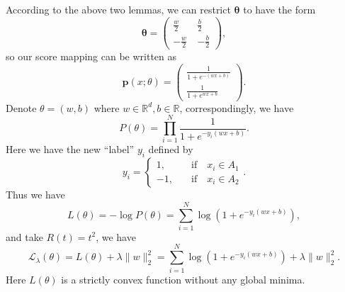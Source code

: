 According to the above two lemmas, we can restrict $\bm\theta$ to have the form
\begin{equation}
	\bm\theta = \begin{pmatrix}
	\frac{w}{2}\ &\frac{b}{2}\\
	-\frac{w}{2}\ &-\frac{b}{2}
	\end{pmatrix},
\end{equation}
so our score mapping can be written as
\begin{equation}\label{key}
\bm p(x;\theta) = \begin{pmatrix} 
	\frac{1}{1+ e^{-(wx+b)}}\\
	\frac{1}{1+e^{wx+b}}
\end{pmatrix}.
\end{equation}
Denote $\theta = (w,b)$ where $w\in \mathbb{R}^d, b\in \mathbb{R}$, correspondingly, we have
\begin{equation}
P(\theta) = \prod_{i = 1}^N \frac{1}{1+ e^{-y_i(wx+b)}}.
\end{equation}
Here we have the new ``label'' $y_i$ defined by
\begin{equation}\label{key}
y_i = \begin{cases}
1, \quad &\text{if}  \quad x_i \in A_1 \\
-1, \quad &\text{if} \quad x_i \in A_2
\end{cases}.
\end{equation}
Thus we have
\begin{equation}
L(\theta) = -\log P(\theta) = \sum_{i = 1}^N \log(1+ e^{-y_i(wx+b)}),
\end{equation}
and take $R(t) = t^2$, we have
\begin{equation}
\mathcal L_{\lambda}(\theta)  = L(\theta) + \lambda \|w\|_2^2 = \sum_{i = 1}^N \log(1+ e^{-y_i(wx+b)}) + \lambda \|w\|_2^2.
\end{equation}
Here $L(\theta)$ is a strictly convex function without any global minima. 



